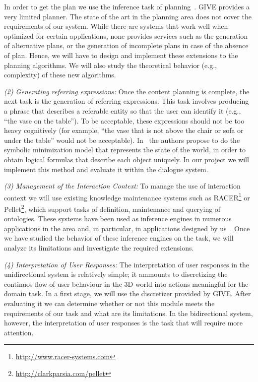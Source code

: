 In order to get the plan we use the inference task of planning~\cite{nau04}.
GIVE provides a very limited planner. The state of the art in the planning area
does not cover the requirements of our
system. While there are systems that work well when optimized for certain
applications, none provides services such as the generation of alternative
plans, or the generation of incomplete plans in case of the absence of plan.
Hence, we will have to design and implement these extensions to the planning
algorithms. We will also study the theoretical behavior (e.g., complexity) of
these new algorithms. 

\emph{(2) Generating referring expressions:} Once the content planning is
complete, the next task is the generation of referring expressions. This task
involves
producing a phrase that describes a referable entity so that the user can
identify it (e.g., ``the vase on the table''). To be
acceptable, these expressions should not be too heavy cognitively (for
example, ``the vase that is not above the chair or sofa or under the
table'' would not be acceptable). In~\cite{AKS08} the authors propose to
do the symbolic minimization model that represents the state of the world, in
order to obtain logical formulas that describe each object uniquely. In our
project we
will implement this method and evaluate it within the dialogue system.

\emph{(3) Management of the Interaction Context:} To manage the use of
interaction context we will use existing knowledge maintenance systems such as
RACER\footnote{\url{http://www.racer-systems.com}} or Pellet\footnote{\url{http://clarkparsia.com/pellet}}, which support tasks of
definition, maintenance and querying of ontologies. These systems have been used
as inference engines in numerous applications in
the area and, in particular,
in applications designed by us~\cite{benotti09b}. Once we
have studied the behavior of these inference engines on the task, we will
analyze
its limitations and investigate the required extensions.

\emph{(4) Interpretation of User Responses:} The interpretation of user
responses in the unidirectional system is relatively simple; it ammounts to
discretizing the continuos flow of user behaviour in the 3D world into actions
meaningful for the domain task. In a first
stage, we will use the discretizer provided by GIVE. After evaluating it we can
determine whether or not this module meets the requirements of
our task and what are its limitations. In the bidirectional system, however,
the interpretation of user responses is the task that will require more
attention.

